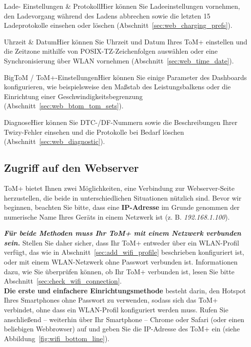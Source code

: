 {Lade- Einstellungen & Protokoll}{Hier können Sie Ladeeinstellungen vornehmen, den Ladevorgang während des Ladens abbrechen sowie die letzten 15 Ladeprotokolle einsehen oder löschen (Abschnitt~\ref{sec:web_charging_prefs}).}

{Uhrzeit & Datum}{Hier können Sie Uhrzeit und Datum Ihres ToM+ einstellen und die Zeitzone mithilfe von POSIX-TZ-Zeichenfolgen auswählen oder eine Synchronisierung über WLAN vornehmen (Abschnitt~\ref{sec:web_time_date}).}

{BigToM / ToM+-Einstellungen}{Hier können Sie einige Parameter des Dashboards konfigurieren, wie beispielsweise den Maßstab des Leistungsbalkens oder die Einrichtung einer Geschwindigkeitsbegrenzung (Abschnitt~\ref{sec:web_btom_tom_sets}).}

{Diagnose}{Hier können Sie DTC-/DF-Nummern sowie die Beschreibungen Ihrer Twizy-Fehler einsehen und die Protokolle bei Bedarf löschen (Abschnitt~\ref{sec:web_diagnostic}).}


\subsection{Zugriff auf den Webserver}
\label{sec:web_server_access}

ToM+ bietet Ihnen zwei Möglichkeiten, eine Verbindung zur Webserver-Seite herzustellen, die beide
in unterschiedlichen Situationen nützlich sind. Bevor wir beginnen, beachten Sie bitte, dass eine \textbf{IP-Adresse}
im Grunde genommen der numerische Name Ihres Geräts in einem Netzwerk ist (z. B. \textit{192.168.1.100}).

\textbf{\textit{Für beide Methoden muss Ihr ToM+ mit einem Netzwerk verbunden sein.}}
Stellen Sie daher sicher, dass Ihr ToM+ entweder über ein WLAN-Profil verfügt, das wie
in Abschnitt~\ref{sec:add_wifi_profile} beschrieben konfiguriert ist, oder mit einem WLAN-Netzwerk ohne Passwort verbunden ist.
Informationen dazu, wie Sie überprüfen können, ob Ihr ToM+ verbunden ist, lesen Sie bitte Abschnitt~\ref{sec:check_wifi_connection}.\\

\textbf{Die erste und einfachere Einrichtungsmethode} besteht darin, den Hotspot Ihres Smartphones ohne Passwort zu verwenden, sodass sich das ToM+ verbindet,
ohne dass ein WLAN-Profil konfiguriert werden muss. Rufen Sie anschließend – weiterhin über Ihr Smartphone – Chrome oder
Safari (oder einen beliebigen Webbrowser) auf und geben Sie die IP-Adresse des ToM+ ein (siehe Abbildung~\ref{fig:wifi_bottom_line}).\\

